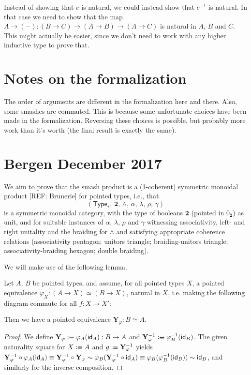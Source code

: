 \documentclass{article}
\renewcommand{\smash}{\wedge}
\renewcommand{\phi}{\varphi}
\renewcommand{\o}{\ensuremath{\circ}}
\newcommand{\sy}{^{-1}}
\newcommand{\pType}{\mathsf{Type}_\ast}
\newcommand{\two}{\mathbf{2}}
\newcommand{\yoneda}{\mathbf{Y}}
\begin{document}
\begin{rmk}
\item Instead of showing that $e$ is natural, we could instead show that $e^{-1}$ is natural. In
  that case we need to show that the map $A\to({-}):(B\to C)\to(A\to B)\to(A\to C)$ is natural in
  $A$, $B$ and $C$. This might actually be easier, since we don't need to work with any higher
  inductive type to prove that.
\end{rmk}

\section{Notes on the formalization}

The order of arguments are different in the formalization here and there.
Also, some smashes are commuted. This is because some unfortunate choices have been made in the formalization. Reversing these choices is possible, but probably more work than it's worth (the final result is exactly the same).

\section{Bergen December 2017}
We aim to prove that the smash product is a (1-coherent) symmetric monoidal product [REF: Brunerie] for pointed types, i.e., that
\[(\pType,\, \two,\, \smash,\, \alpha,\, \lambda,\, \rho,\, \gamma)\]
is a symmetric monoidal category, with the type of booleans $\two$ (pointed in $0_\two$) as unit, and for suitable instances of $\alpha$, $\lambda$, $\rho$ and $\gamma$ witnessing associativity, left- and right unitality and the braiding for $\smash$ and satisfying appropriate coherence relations (associativity pentagon; unitors triangle; braiding-unitors triangle; associativity-braiding hexagon; double braiding).

We will make use of the following lemma.
\begin{lem}[Yoneda]\label{lem:yoneda}
Let $A$, $B$ be pointed types, and assume, for all pointed types $X$, a pointed equivalence $\phi_X : (A \to X) \simeq (B \to X)$, natural in $X$, i.e. making the following diagram commute for all $f : X \to X'$:
\begin{center}
\end{center}
Then we have a pointed equivalence $\yoneda_\phi : B \simeq A$.
\end{lem}
\begin{proof}
We define $\yoneda_\phi \defeq \phi_A(\idfunc[A]) : B \to A$ and $\yoneda_\phi\sy \defeq \phi_B\sy(\idfunc[B])$. The given naturality square for $X \vcentcolon\equiv A$ and $g \defeq \yoneda_\phi\sy$ yields $\yoneda_\phi\sy \o \phi_A (\idfunc[A]) \judgeq \yoneda_\phi\sy \o \yoneda_\phi \sim \phi_B (\yoneda_\phi\sy \o \idfunc[A]) \judgeq \phi_B (\phi_B\sy (\idfunc[B])) \sim \idfunc[B]$, and similarly for the inverse composition.
\end{proof}
\end{document}

